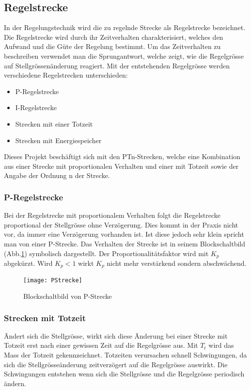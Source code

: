 
\subsection{Regelstrecke}
In der Regelungstechnik wird die zu regelnde Strecke als Regelstrecke bezeichnet. Die Regelstrecke wird durch ihr Zeitverhalten charakterisiert, welches den Aufwand und die Güte der Regelung bestimmt. Um das Zeitverhalten zu beschreiben verwendet man die Sprungantwort, welche zeigt, wie die Regelgrösse auf Stellgrössenänderung reagiert. Mit der entstehenden Regelgrösse werden verschiedene Regelstrecken unterschieden:
\begin{itemize}   
 \item  P-Regelstrecke
 \item I-Regelstrecke
 \item    Strecken mit einer Totzeit
 \item Strecken mit Energiespeicher
\end{itemize}

Dieses Projekt beschäftigt sich mit  den PTn-Strecken, welche eine Kombination aus einer Strecke mit proportionalen Verhalten und einer mit Totzeit sowie der Angabe der  Ordnung n der Strecke.

\subsubsection*{P-Regelstrecke}
Bei der Regelstrecke mit proportionalem Verhalten folgt die Regelstrecke proportional der Stellgrösse ohne Verzögerung. Dies kommt in der Praxis nicht vor, da immer eine Verzögerung vorhanden ist. Ist diese jedoch sehr klein spricht man von einer P-Strecke. Das Verhalten der Strecke ist in seinem Blockschaltbild (Abb.\ref {fig:PStrecke}) symbolisch dargestellt. Der Proportionalitätsfaktor wird mit $K_p$ abgekürzt. Wird $K_p<1$ wirkt $K_p$ nicht mehr verstärkend sondern abschwächend.\\

\begin{figure}[h!, width=\pagewidth]
\begin{center}
\texttt{[image: PStrecke]}
\caption{Blockschaltbild von P-Strecke}
\label{fig:PStrecke}
\end{center}
\end{figure}


\subsubsection*{Strecken mit Totzeit}
Ändert sich die Stellgrösse, wirkt sich diese Änderung bei einer Strecke mit Totzeit erst nach einer gewissen Zeit auf die Regelgrösse aus. Mit $T_t$ wird das Mass der Totzeit gekennzeichnet. 
Totzeiten verursachen schnell Schwingungen, da sich die Stellgrösseänderung zeitverzögert auf die Regelgrösse auswirkt. Die Schwingungen entstehen wenn sich die Stellgrösse und die Regelgrösse periodisch ändern.

